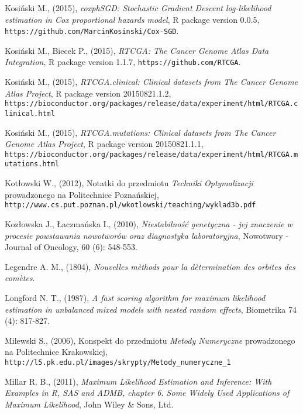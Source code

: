 \begin{thebibliography}{99}
 Kosiński M., (2015), \textit{coxphSGD: Stochastic Gradient Descent log-likelihood estimation in Cox proportional hazards model}, R package version 0.0.5,  \texttt{https://github.com/MarcinKosinski/Cox-SGD}.

 Kosiński M., Biecek P., (2015), \textit{RTCGA: The Cancer Genome Atlas Data Integration}, R package version 1.1.7, \texttt{https://github.com/RTCGA}.

 Kosiński M., (2015), \textit{RTCGA.clinical: Clinical datasets from The Cancer Genome Atlas Project}, R package version 20150821.1.2, \\ \texttt{https://bioconductor.org/packages/release/data/experiment/html/RTCGA.clinical.html}

 Kosiński M., (2015), \textit{RTCGA.mutations: Clinical datasets from The Cancer Genome Atlas Project}, R package version 20150821.1.1, \\ \texttt{https://bioconductor.org/packages/release/data/experiment/html/RTCGA.mutations.html}

 Kotłowski W., (2012), Notatki do przedmiotu \textit{Techniki Optymalizacji} prowadzonego na Politechnice Poznańskiej, \\ \texttt{http://www.cs.put.poznan.pl/wkotlowski/teaching/wyklad3b.pdf}

 Kozłowska J., Łaczmańska I., (2010), \textit{Niestabilność genetyczna - jej znaczenie w procesie powstawania nowotworów oraz diagnostyka laboratoryjna}, Nowotwory - Journal of Oncology, 60 (6): 548-553.

 Legendre A. M., (1804), \textit{Nouvelles m\`ethods pour la d\`etermination des orbites des com\`etes}.


 Longford N. T., (1987), \textit{A fast scoring algorithm for maximum likelihood estimation in unbalanced mixed models with nested random effects}, Biometrika 74 (4): 817-827.

 Milewski S., (2006), Konspekt do przedmiotu \textit{Metody Numeryczne} prowadzonego na Politechnice Krakowskiej, \\ \texttt{http://l5.pk.edu.pl/images/skrypty/Metody\_numeryczne\_1}

 Millar R. B., (2011), \textit{Maximum Likelihood Estimation and Inference: With Examples in R, SAS and ADMB, chapter 6. Some Widely Used Applications of Maximum Likelihood}, John Wiley \& Sons, Ltd.


\end{thebibliography}
